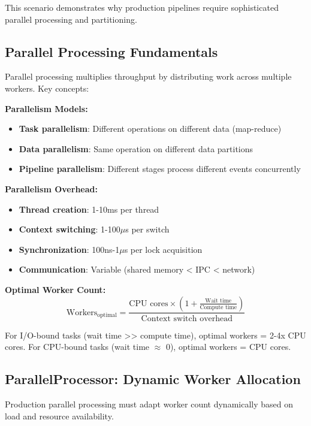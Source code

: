This scenario demonstrates why production pipelines require sophisticated parallel processing and partitioning.

\subsection{Parallel Processing Fundamentals}

Parallel processing multiplies throughput by distributing work across multiple workers. Key concepts:

\textbf{Parallelism Models:}
\begin{itemize}
    \item \textbf{Task parallelism}: Different operations on different data (map-reduce)
    \item \textbf{Data parallelism}: Same operation on different data partitions
    \item \textbf{Pipeline parallelism}: Different stages process different events concurrently
\end{itemize}

\textbf{Parallelism Overhead:}
\begin{itemize}
    \item \textbf{Thread creation}: 1-10ms per thread
    \item \textbf{Context switching}: 1-100\ensuremath{\mu}s per switch
    \item \textbf{Synchronization}: 100ns-1\ensuremath{\mu}s per lock acquisition
    \item \textbf{Communication}: Variable (shared memory < IPC < network)
\end{itemize}

\textbf{Optimal Worker Count:}
\begin{equation}
\text{Workers}_{\text{optimal}} = \frac{\text{CPU cores} \times (1 + \frac{\text{Wait time}}{\text{Compute time}})}{\text{Context switch overhead}}
\end{equation}

For I/O-bound tasks (wait time >> compute time), optimal workers = 2-4x CPU cores.
For CPU-bound tasks (wait time \ensuremath{\approx} 0), optimal workers = CPU cores.

\subsection{ParallelProcessor: Dynamic Worker Allocation}

Production parallel processing must adapt worker count dynamically based on load and resource availability.

